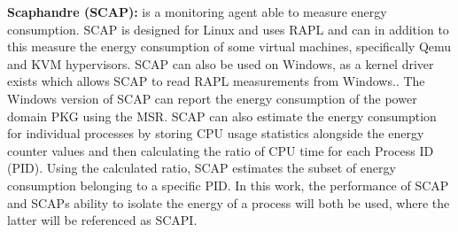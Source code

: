 
\noindent\textbf{Scaphandre (SCAP):} is a monitoring agent able to measure energy consumption.\cite{scaphandre} SCAP is designed for Linux and uses RAPL and can in addition to this measure the energy consumption of some virtual machines, specifically Qemu and KVM hypervisors. SCAP can also be used on Windows, as a kernel driver exists which allows SCAP to read RAPL measurements from Windows.\cite{RAPL_Windows}. %
The Windows version of SCAP can report the energy consumption of the power domain PKG using the MSR. SCAP can also estimate the energy consumption for individual processes by storing CPU usage statistics alongside the energy counter values and then calculating the ratio of CPU time for each Process ID (PID). Using the calculated ratio, SCAP estimates the subset of energy consumption belonging to a specific PID. In this work, the performance of SCAP and SCAPs ability to isolate the energy of a process will both be used, where the latter will be referenced as SCAPI.

